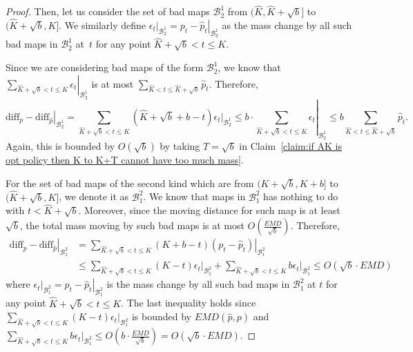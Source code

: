 \begin{proof}
    Then, let us consider the set of bad maps $\mathcal{B}^1_2$ from $(\hat{K},\hat{K}+\sqrt{b}]$ to $(\hat{K}+\sqrt{b},K]$. We similarly define $\left. \epsilon_t \right|_{\mathcal{B}^1_2} = \left. p_t - \hat{p}_t \right|_{\mathcal{B}^1_2}$ as the mass change by all such bad maps in $\mathcal{B}^1_2$ at~$t$ for any point $\hat{K}+\sqrt{b}<t \leq K$.

    Since we are considering bad maps of the form $\mathcal{B}^1_2$, we know that $\left. \sum_{ \hat{K}+\sqrt{b}<t \leq K} \epsilon_t \right|_{\mathcal{B}^1_2}$ is at most $\sum_{\hat{K}<t \leq \hat{K}+\sqrt{b}}\hat{p}_t$. Therefore, 
    $$\left. \text{diff}_p - \text{diff}_{\hat{p}}\right|_{\mathcal{B}^1_2} = \sum_{\hat{K}+\sqrt{b}< t \leq K}(\hat{K}+\sqrt{b}+b-t)\left. \epsilon_t \right|_{\mathcal{B}^1_2} \leq b \cdot  \left. \sum_{ \hat{K}+\sqrt{b}<t \leq K} \epsilon_t \right|_{\mathcal{B}^1_2} \leq b \sum_{\hat{K}<t \leq \hat{K}+\sqrt{b}}\hat{p}_t.$$
    Again, this is bounded by $O(\sqrt{b})$ by taking $T=\sqrt{b}$ in Claim~\ref{claim:if AK is opt policy then K to K+T cannot have too much mass}.



    For the set of bad maps of the second kind which are from $(K+\sqrt{b},K+b]$ to $(\hat{K}+\sqrt{b},K]$, we denote it as $\mathcal{B}^2_1$. We know that maps in $\mathcal{B}^2_1$ has nothing to do with $t<\hat{K}+\sqrt{b}$. Moreover, since the moving distance for such map is at least $\sqrt{b}$, the total mass moving by such bad maps is at most $O(\frac{EMD}{\sqrt{b}})$. Therefore,
    \begin{align*}
    \left. \text{diff}_p - \text{diff}_{\hat{p}}\right|_{\mathcal{B}^2_1} &= \sum_{\hat{K} + \sqrt{b}< t \leq K}(K+b-t)\left.(p_t-\hat{p}_t) \right|_{\mathcal{B}^2_1} \\
    &\leq \sum_{\hat{K} + \sqrt{b}< t \leq K}(K-t)\left.\epsilon_t \right|_{\mathcal{B}^2_1} + \sum_{\hat{K} + \sqrt{b}< t \leq K}b\left.\epsilon_t \right|_{\mathcal{B}^2_1} \leq O(\sqrt{b}\cdot EMD)
    \end{align*}
    where $\left. \epsilon_t \right|_{\mathcal{B}^2_1} = \left. p_t - \hat{p}_t \right|_{\mathcal{B}^2_1}$ is the mass change by all such bad maps in $\mathcal{B}^2_1$ at $t$ for any point $\hat{K} + \sqrt{b}< t \leq K$. The last inequality holds since $\sum_{\hat{K} + \sqrt{b}< t \leq K}(K-t)\left.\epsilon_t \right|_{\mathcal{B}^2_1}$ is bounded by $EMD(\hat{p},p)$ and $\sum_{\hat{K} + \sqrt{b}< t \leq K}b\left.\epsilon_t \right|_{\mathcal{B}^2_1} \leq O(b \cdot \frac{EMD}{\sqrt{b}}) = O(\sqrt{b} \cdot EMD)$.


\end{proof}
